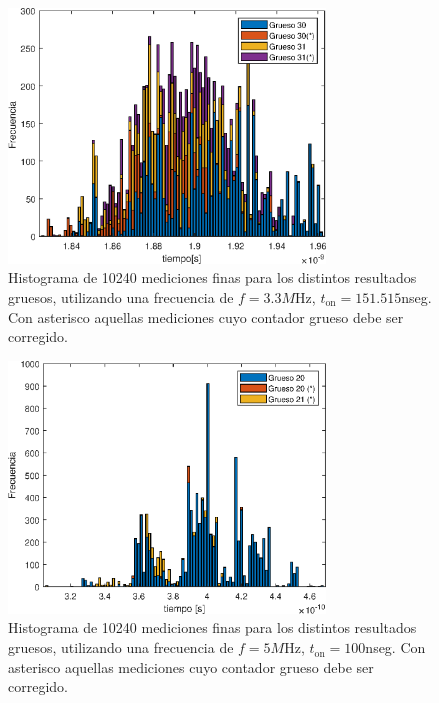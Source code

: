 \begin{figure}[H]
     \centering
     \includegraphics[width=0.75\textwidth]{imagenes/histograma_3M3.eps}
     \caption{Histograma de 10240 mediciones finas para los distintos resultados gruesos, 
      utilizando una frecuencia de $f=3.3M$Hz, $t_{\text{on}}=151.515$nseg. 
      Con asterisco aquellas mediciones cuyo contador grueso debe ser corregido.}
     \label{fig: histograma_3M}
\end{figure}

\begin{figure}[H]
     \centering
     \includegraphics[width=0.75\textwidth]{imagenes/histograma_5M.eps}
     \caption{Histograma de 10240 mediciones finas para los distintos resultados gruesos, 
      utilizando una frecuencia de $f=5M$Hz, $t_{\text{on}}=100$nseg. 
      Con asterisco aquellas mediciones cuyo contador grueso debe ser corregido.}
     \label{fig: histograma_3M}
\end{figure}



